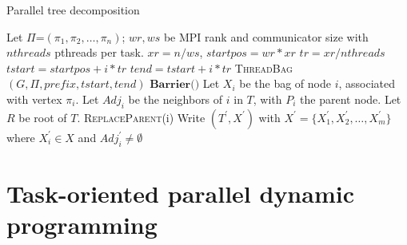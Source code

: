 \documentclass[conference]{IEEEtran}
\begin{document}
\begin{algorithm}[ht!]
\caption{Parallel tree decomposition}
\label{alg:par_td}
\begin{algorithmic}[1]
\State Let $\Pi$=$(\pi_1, \pi_2, \ldots, \pi_n)$; $wr, ws$ be MPI rank and communicator size with $nthreads$ pthreads per task.
\State $xr = n/ws$, $startpos = wr*xr$
\State $tr = xr/nthreads$
\State $tstart = startpos + i*tr$
\State $tend = tstart + i*tr$
\State \textsc{ThreadBag} $(G, \Pi, prefix, tstart, tend)$
\EndFor
\State $\textbf{Barrier()}$
\label{pbag_gen:line:gather}
\State Let $X_i$ be the bag of node $i$, associated with vertex $\pi_i$.
Let $Adj_i$ be the neighbors of $i$ in $T$, with $P_i$ the parent node.
Let $R$ be root of $T$.
\State \textsc{ReplaceParent}(i)
\EndIf
\EndFor
\EndIf
\State Write $(T^{\prime}, X^{\prime})$ with
$X^{\prime} = \{X^{\prime}_1, X^{\prime}_2, \ldots, X^{\prime}_m\}$
where $X^{\prime}_i \in X$ and $Adj^{\prime}_{i} \neq \emptyset$
\EndProcedure
\end{algorithmic}
\end{algorithm}


\section{Task-oriented parallel dynamic programming}
\end{document}

